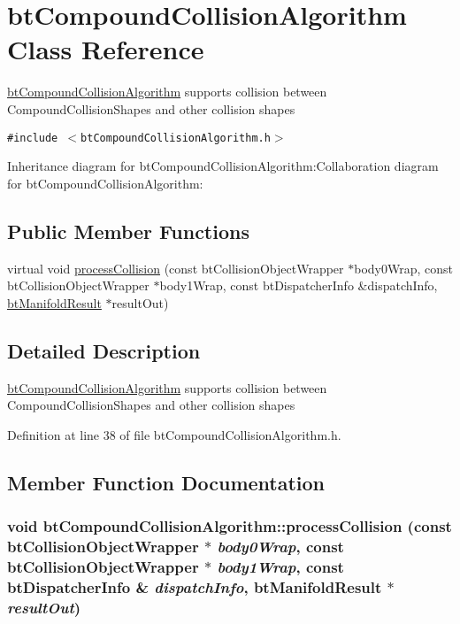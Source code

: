 \hypertarget{classbt_compound_collision_algorithm}{
\section{btCompoundCollisionAlgorithm Class Reference}
\label{classbt_compound_collision_algorithm}
}
\hyperlink{classbt_compound_collision_algorithm}{btCompoundCollisionAlgorithm} supports collision between CompoundCollisionShapes and other collision shapes  


{\tt \#include $<$btCompoundCollisionAlgorithm.h$>$}

Inheritance diagram for btCompoundCollisionAlgorithm:Collaboration diagram for btCompoundCollisionAlgorithm:\subsection*{Public Member Functions}
\begin{CompactItemize}
\item 
virtual void \hyperlink{classbt_compound_collision_algorithm_173ce993461795e0572dd2924c54cdc0}{processCollision} (const btCollisionObjectWrapper $\ast$body0Wrap, const btCollisionObjectWrapper $\ast$body1Wrap, const btDispatcherInfo \&dispatchInfo, \hyperlink{classbt_manifold_result}{btManifoldResult} $\ast$resultOut)
\end{CompactItemize}


\subsection{Detailed Description}
\hyperlink{classbt_compound_collision_algorithm}{btCompoundCollisionAlgorithm} supports collision between CompoundCollisionShapes and other collision shapes 

Definition at line 38 of file btCompoundCollisionAlgorithm.h.

\subsection{Member Function Documentation}
\hypertarget{classbt_compound_collision_algorithm_173ce993461795e0572dd2924c54cdc0}{
\subsubsection[processCollision]{\setlength{\rightskip}{0pt plus 5cm}void btCompoundCollisionAlgorithm::processCollision (const btCollisionObjectWrapper $\ast$ {\em body0Wrap}, \/  const btCollisionObjectWrapper $\ast$ {\em body1Wrap}, \/  const btDispatcherInfo \& {\em dispatchInfo}, \/  {\bf btManifoldResult} $\ast$ {\em resultOut})}}
\label{classbt_compound_collision_algorithm_173ce993461795e0572dd2924c54cdc0}




